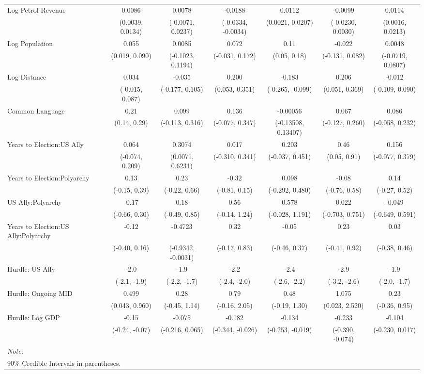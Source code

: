 \begin{table}
{\begin{tabular}[t]{lcccccc}
Log Petrol Revenue & 0.0086 & 0.0078 & -0.0188 & 0.0112 & -0.0099 & 0.0114\\
 & (0.0039, 0.0134) & (-0.0071, 0.0237) & (-0.0334, -0.0034) & (0.0021, 0.0207) & (-0.0230, 0.0030) & (0.0016, 0.0213)\\
Log Population & 0.055 & 0.0085 & 0.072 & 0.11 & -0.022 & 0.0048\\
 & (0.019, 0.090) & (-0.1023, 0.1194) & (-0.031, 0.172) & (0.05, 0.18) & (-0.131, 0.082) & (-0.0719, 0.0807)\\
Log Distance & 0.034 & -0.035 & 0.200 & -0.183 & 0.206 & -0.012\\
 & (-0.015, 0.087) & (-0.177, 0.105) & (0.053, 0.351) & (-0.265, -0.099) & (0.051, 0.369) & (-0.109, 0.090)\\
Common Language & 0.21 & 0.099 & 0.136 & -0.00056 & 0.067 & 0.086\\
 & (0.14, 0.29) & (-0.113, 0.316) & (-0.077, 0.347) & (-0.13508, 0.13407) & (-0.127, 0.260) & (-0.058, 0.232)\\
Years to Election:US Ally & 0.064 & 0.3074 & 0.017 & 0.203 & 0.46 & 0.156\\
 & (-0.074, 0.209) & (0.0071, 0.6231) & (-0.310, 0.341) & (-0.037, 0.451) & (0.05, 0.91) & (-0.077, 0.379)\\
Years to Election:Polyarchy & 0.13 & 0.23 & -0.32 & 0.098 & -0.08 & 0.14\\
 & (-0.15, 0.39) & (-0.22, 0.66) & (-0.81, 0.15) & (-0.292, 0.480) & (-0.76, 0.58) & (-0.27, 0.52)\\
US Ally:Polyarchy & -0.17 & 0.18 & 0.56 & 0.578 & 0.022 & -0.049\\
 & (-0.66, 0.30) & (-0.49, 0.85) & (-0.14, 1.24) & (-0.028, 1.191) & (-0.703, 0.751) & (-0.649, 0.591)\\
Years to Election:US Ally:Polyarchy & -0.12 & -0.4723 & 0.32 & -0.05 & 0.23 & 0.03\\
 & (-0.40, 0.16) & (-0.9342, -0.0031) & (-0.17, 0.83) & (-0.46, 0.37) & (-0.41, 0.92) & (-0.38, 0.46)\\
Hurdle: US Ally & -2.0 & -1.9 & -2.2 & -2.4 & -2.9 & -1.9\\
 & (-2.1, -1.9) & (-2.2, -1.7) & (-2.4, -2.0) & (-2.6, -2.2) & (-3.2, -2.6) & (-2.0, -1.7)\\
Hurdle: Ongoing MID & 0.499 & 0.28 & 0.79 & 0.48 & 1.075 & 0.23\\
 & (0.043, 0.960) & (-0.45, 1.14) & (-0.16, 2.05) & (-0.19, 1.30) & (0.023, 2.520) & (-0.36, 0.95)\\
Hurdle: Log GDP & -0.15 & -0.075 & -0.182 & -0.134 & -0.233 & -0.104\\
 & (-0.24, -0.07) & (-0.216, 0.065) & (-0.344, -0.026) & (-0.253, -0.019) & (-0.390, -0.074) & (-0.230, 0.017)\\
\bottomrule
\multicolumn{7}{l}{\rule{0pt}{1em}\textit{Note: }}\\
\multicolumn{7}{l}{\rule{0pt}{1em}90\% Credible Intervals in parentheses.}\\
\end{tabular}}
\end{table}
